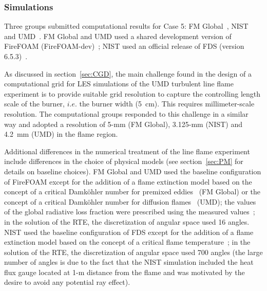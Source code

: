 \subsubsection{Simulations}

Three groups submitted computational results for Case 5: FM Global~\cite{Case5_SIM_FMG}, NIST~\cite{Case5_SIM_NIST} and UMD~\cite{Case5_SIM_UMD}. FM Global and UMD used a shared development version of FireFOAM (FireFOAM-dev)~\cite{FireFOAM}; NIST used an official release of FDS (version 6.5.3)~\cite{FDS}.

As discussed in section~\ref{sec:CGD}, the main challenge found in the design of a computational grid for LES simulations of the UMD turbulent line flame experiment is to provide suitable grid resolution to capture the controlling length scale of the burner, $i.e.$ the burner width (5~cm). This requires millimeter-scale resolution. The computational groups responded to this challenge in a similar way and adopted a resolution of 5-mm (FM Global), 3.125-mm (NIST) and 4.2~mm (UMD) in the flame region.

Additional differences in the numerical treatment of the line flame experiment include differences in the choice of physical models (see section~\ref{sec:PM} for details on baseline choices). FM Global and UMD used the baseline configuration of FireFOAM except for the addition of a flame extinction model based on the concept of a critical Damk\"ohler number for premixed eddies~\cite{Dorofeev:2016} (FM Global) or the concept of a critical Damk\"ohler number for diffusion flames~\cite{Vilfayeau:2016} (UMD); the values of the global radiative loss fraction were prescribed using the measured values~\cite{Case5_EXP_2}; in the solution of the RTE, the discretization of angular space used 16 angles. NIST used the baseline configuration of FDS except for the addition of a flame extinction model based on the concept of a critical flame temperature~\cite{Vaari:2011,White:2017}; in the solution of the RTE, the discretization of angular space used 700 angles (the large number of angles is due to the fact that the NIST simulation included the heat flux gauge located at 1-m distance from the flame and was motivated by the desire to avoid any potential ray effect). 

